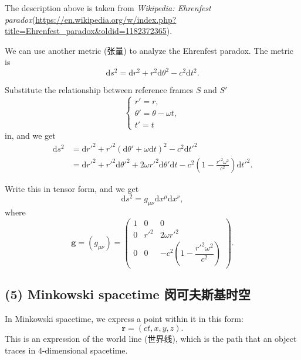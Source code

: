 The description above is taken from \emph{Wikipedia: Ehrenfest paradox}\newline (\url{https://en.wikipedia.org/w/index.php?title=Ehrenfest_paradox&oldid=1182372365}).

We can use another metric (张量) to analyze the Ehrenfest paradox. The
metric is
\[\mathrm{d}s^2 = \mathrm{d}r^2 + r^2 \mathrm{d}\theta^2 - c^2 \mathrm{d}t^2.\]

Substitute the relationship between reference frames \(S\) and \(S'\)
\[\left\{
    \begin{array}{l}
        r' = r, \\
        \theta' = \theta - \omega t, \\
        t' = t
    \end{array}
\right.\] in, and we get \begin{align*}
    \mathrm{d}s^2 & = \mathrm{d}r'^2 + r'^2 \left( \mathrm{d}\theta' + \omega \mathrm{d}t \right)^2 - c^2 \mathrm{d}t'^2 \\
    & = \mathrm{d}r'^2 + r'^2 \mathrm{d}\theta'^2 + 2 \omega r'^2 \mathrm{d}\theta' \mathrm{d}t - c^2 \left( 1 - \frac{r'^2 \omega^2}{c^2} \right) \mathrm{d}t'^2.
\end{align*}

Write this in tensor form, and we get
\[\mathrm{d} s^2 = g_{\mu\nu} \mathrm{d}x^{\mu} \mathrm{d}x^{\nu},\]
where \[\mathbf{g} = (g_{\mu\nu}) = \begin{pmatrix}
    1 & 0 & 0 \\
    0 & r'^2 & 2 \omega r'^2 \\
    0 & 0 & - c^2 \left( 1 - \dfrac{r'^2 \omega^2}{c^2} \right)
\end{pmatrix}.\]

\subsection*{(5) Minkowski spacetime
闵可夫斯基时空}\label{minkowski-spacetime-ux95f5ux53efux592bux65afux57faux65f6ux7a7a-2}

In Minkowski spacetime, we express a point within it in this form:
\[\boldsymbol{r} = (ct, x, y, z).\] This is an expression of the world
line (世界线), which is the path that an object traces in 4-dimensional
spacetime.

